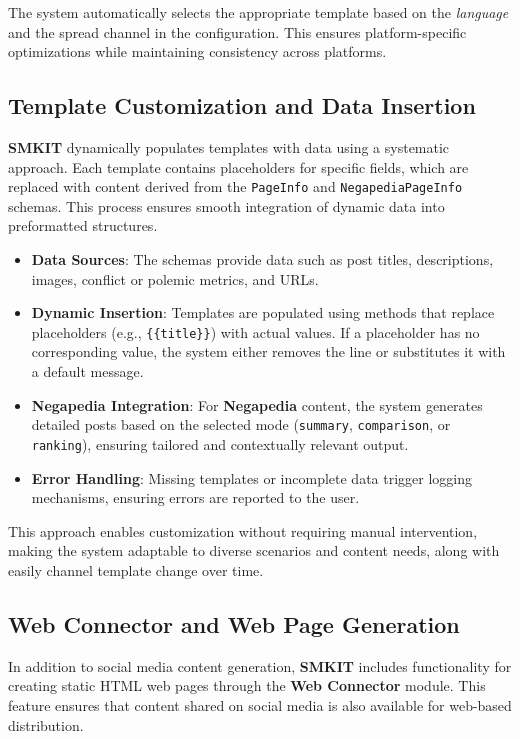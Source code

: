 The system automatically selects the appropriate template based on the \textit{language} and the spread channel in the configuration. This ensures platform-specific optimizations while maintaining consistency across platforms.

\subsection{Template Customization and Data Insertion}
\label{subsec:template_customization_and_data_insertion}
\textbf{SMKIT} dynamically populates templates with data using a systematic approach. Each template contains placeholders for specific fields, which are replaced with content derived from the \texttt{PageInfo} and \texttt{NegapediaPageInfo} schemas. This process ensures smooth integration of dynamic data into preformatted structures.

\begin{itemize}
    \item \textbf{Data Sources}: The schemas provide data such as post titles, descriptions, images, conflict or polemic metrics, and URLs.
    \item \textbf{Dynamic Insertion}: Templates are populated using methods that replace placeholders (e.g., \texttt{\{\{title\}\}}) with actual values. If a placeholder has no corresponding value, the system either removes the line or substitutes it with a default message.
    \item \textbf{Negapedia Integration}: For \textbf{Negapedia} content, the system generates detailed posts based on the selected mode (\texttt{summary}, \texttt{comparison}, or \texttt{ranking}), ensuring tailored and contextually relevant output.
    \item \textbf{Error Handling}: Missing templates or incomplete data trigger logging mechanisms, ensuring errors are reported to the user.
\end{itemize}

This approach enables customization without requiring manual intervention, making the system adaptable to diverse scenarios and content needs, along with easily channel template change over time.

\subsection{Web Connector and Web Page Generation}
\label{subsec:web_connector_and_web_page_generation}
In addition to social media content generation, \textbf{SMKIT} includes functionality for creating static HTML web pages through the \textbf{Web Connector} module. This feature ensures that content shared on social media is also available for web-based distribution.

